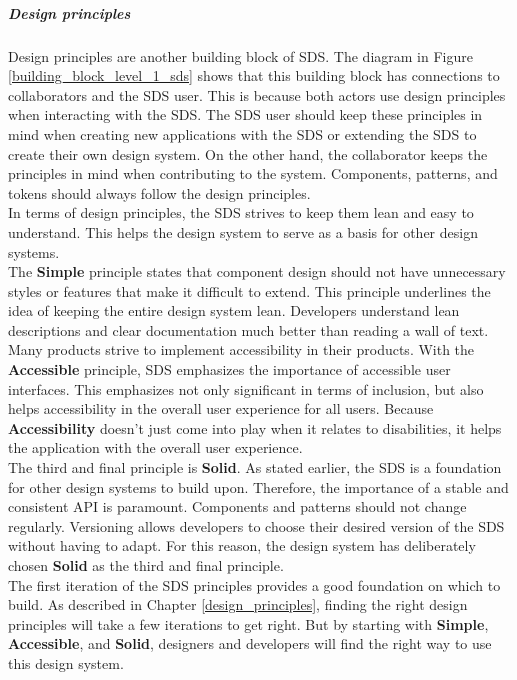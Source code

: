 \subparagraph{Design principles}
Design principles are another building block of \ac{SDS}. The diagram in Figure \ref{building_block_level_1_sds} shows that this building block has connections to collaborators and the \ac{SDS} user. This is because both actors use design principles when interacting with the \ac{SDS}. The \ac{SDS} user should keep these principles in mind when creating new applications with the \ac{SDS} or extending the \ac{SDS} to create their own design system. On the other hand, the collaborator keeps the principles in mind when contributing to the system. Components, patterns, and tokens should always follow the design principles. \\
In terms of design principles, the \ac{SDS} strives to keep them lean and easy to understand. This helps the design system to serve as a basis for other design systems. \\
The \textbf{Simple} principle states that component design should not have unnecessary styles or features that make it difficult to extend. This principle underlines the idea of keeping the entire design system lean. Developers understand lean descriptions and clear documentation much better than reading a wall of text. \\
Many products strive to implement accessibility in their products. With the \textbf{Accessible} principle, \ac{SDS} emphasizes the importance of accessible user interfaces. This emphasizes not only significant in terms of inclusion, but also helps accessibility in the overall user experience for all users. Because \textbf{Accessibility} doesn't just come into play when it relates to disabilities, it helps the application with the overall user experience. \\
The third and final principle is \textbf{Solid}. As stated earlier, the \ac{SDS} is a foundation for other design systems to build upon. Therefore, the importance of a stable and consistent API is paramount. Components and patterns should not change regularly. Versioning allows developers to choose their desired version of the \ac{SDS} without having to adapt. For this reason, the design system has deliberately chosen \textbf{Solid} as the third and final principle. \\
The first iteration of the \acl{SDS} principles provides a good foundation on which to build. As described in Chapter \ref{design_principles}, finding the right design principles will take a few iterations to get right. But by starting with \textbf{Simple}, \textbf{Accessible}, and \textbf{Solid}, designers and developers will find the right way to use this design system.

